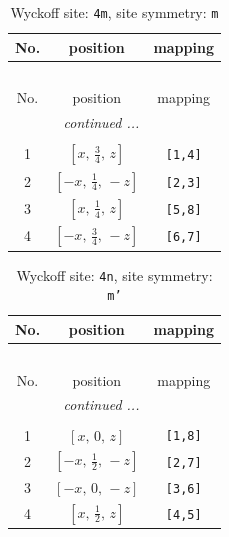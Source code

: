 \documentclass[fleqn,8pt]{jsarticle}
\begin{document}
\renewcommand{\arraystretch}{1.2}
\begin{longtable}{ccc}
\caption{Wyckoff site: {\tt 4m}, site symmetry: {\tt m}}
 \\
 \hline \hline
No. & position & mapping \\ \hline \endfirsthead

\multicolumn{2}{l}{\tablename\ \thetable{}} \\
 \hline \hline
No. & position & mapping \\ \hline \endhead

 \hline \hline
\multicolumn{2}{r}{\footnotesize\it continued ...} \\ \endfoot

 \hline \hline
\multicolumn{2}{r}{} \\ \endlastfoot

1 & $\left[ x,\, \frac{3}{4},\, z \right]$ & {\tt [1,4]} \\ \hline
2 & $\left[ - x,\, \frac{1}{4},\, - z \right]$ & {\tt [2,3]} \\ \hline
3 & $\left[ x,\, \frac{1}{4},\, z \right]$ & {\tt [5,8]} \\ \hline
4 & $\left[ - x,\, \frac{3}{4},\, - z \right]$ & {\tt [6,7]} \\
\end{longtable}
\renewcommand{\arraystretch}{1.2}
\begin{longtable}{ccc}
\caption{Wyckoff site: {\tt 4n}, site symmetry: {\tt m'}}
 \\
 \hline \hline
No. & position & mapping \\ \hline \endfirsthead

\multicolumn{2}{l}{\tablename\ \thetable{}} \\
 \hline \hline
No. & position & mapping \\ \hline \endhead

 \hline \hline
\multicolumn{2}{r}{\footnotesize\it continued ...} \\ \endfoot

 \hline \hline
\multicolumn{2}{r}{} \\ \endlastfoot

1 & $\left[ x,\, 0,\, z \right]$ & {\tt [1,8]} \\ \hline
2 & $\left[ - x,\, \frac{1}{2},\, - z \right]$ & {\tt [2,7]} \\ \hline
3 & $\left[ - x,\, 0,\, - z \right]$ & {\tt [3,6]} \\ \hline
4 & $\left[ x,\, \frac{1}{2},\, z \right]$ & {\tt [4,5]} \\
\end{longtable}
\end{document}
